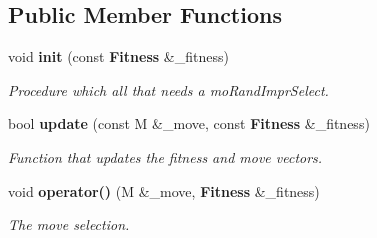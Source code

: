 \subsection*{Public Member Functions}
\begin{CompactItemize}
\item 
void {\bf init} (const {\bf Fitness} \&\_\-fitness)
\begin{CompactList}\small\item\em Procedure which all that needs a mo\-Rand\-Impr\-Select. \item\end{CompactList}\item 
bool {\bf update} (const M \&\_\-move, const {\bf Fitness} \&\_\-fitness)
\begin{CompactList}\small\item\em Function that updates the fitness and move vectors. \item\end{CompactList}\item 
void {\bf operator()} (M \&\_\-move, {\bf Fitness} \&\_\-fitness)
\begin{CompactList}\small\item\em The move selection. \item\end{CompactList}\end{CompactItemize}
